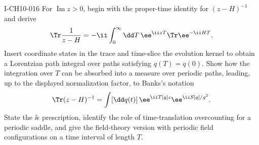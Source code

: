 \begin{exercise}{I-CH10-016}
For $\operatorname{Im}z>0$, begin with the proper-time identity for
$(z-H)^{-1}$ and derive
\[
  \Tr\frac1{z-H}=-\ii\int_0^\infty\dd T\,
  \ee^{\ii zT}\Tr\ee^{-\ii HT}.
\]
Insert coordinate states in the trace and time-slice the evolution kernel to
obtain a Lorentzian path integral over paths satisfying $q(T)=q(0)$.  Show how
the integration over $T$ can be absorbed into a measure over periodic paths,
leading, up to the displayed normalization factor, to Banks's notation
\[
  \Tr(z-H)^{-1}=\int[\dd q(t)]\,
  \ee^{\ii T[q]z}\ee^{\ii S[q]/g^2}.
\]
State the $\ii\epsilon$ prescription, identify the role of time-translation
overcounting for a periodic saddle, and give the field-theory version with
periodic field configurations on a time interval of length $T$.
\end{exercise}

